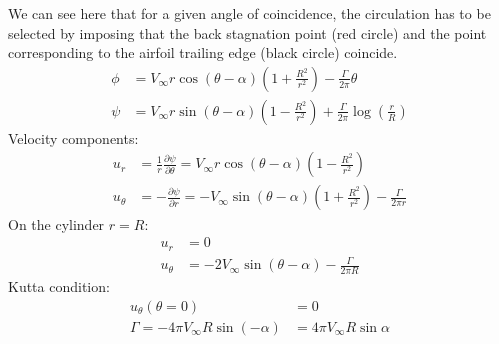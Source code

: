 \documentclass[class=report, crop=false, 12pt,a4paper]{standalone}
\begin{document}
We can see here that for a given angle of coincidence, the circulation has to be selected by imposing that the back stagnation point (red circle) and the point corresponding to the airfoil trailing edge (black circle) coincide.
\begin{align}
  \phi &= V_\infty r \cos{(\theta - \alpha )}\left(1 + \frac{R^2}{r^2}\right) - \frac{\Gamma}{2\pi}\theta\\
  \psi &= V_\infty r \sin{(\theta - \alpha)}\left(1 - \frac{R^2}{r^2}\right) + \frac{\Gamma}{2\pi} \log{\left(\frac{r}{R}\right)}
\end{align}
Velocity components:
\begin{align}
  u_r &= \frac{1}{r} \frac{\partial \psi}{\partial \theta} = V_\infty r \cos{(\theta - \alpha)}\left(1-\frac{R^2}{r^2}\right)\\
  u_\theta &= - \frac{\partial \psi}{\partial r} = -V_\infty \sin{(\theta - \alpha)} \left(1 + \frac{R^2}{r^2}\right) - \frac{\Gamma}{2\pi r}
\end{align}
On the cylinder $r = R$:
\begin{align}
  u_r &= 0 \\
  u_\theta &= -2V_\infty \sin{(\theta-\alpha)} - \frac{\Gamma}{2\pi R}
\end{align}
Kutta condition:
\begin{align}
  u_\theta (\theta = 0) &= 0\\
  \Gamma = -4\pi V_\infty R \sin{(-\alpha)} &= 4\pi V_\infty R\sin{\alpha}
\end{align}
\end{document}
